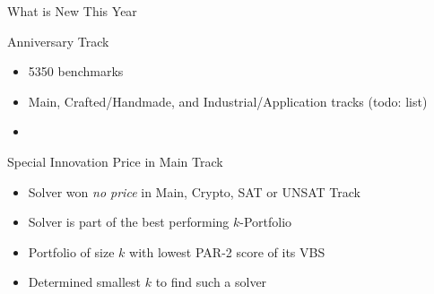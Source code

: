 \documentclass[trans]{beamer}
\begin{document}
\begin{frame}{What is New This Year}

\begin{block}{Anniversary Track}
\begin{itemize}
  \item 5350 benchmarks
  \item Main, Crafted/Handmade, and Industrial/Application tracks (todo: list)
  \item 
\end{itemize}
\end{block}

\begin{block}{Special Innovation Price in Main Track}
  \begin{itemize}
  \item Solver won \emph{no price} in Main, Crypto, SAT or UNSAT Track 
  \item Solver is part of the best performing $k$-Portfolio
  \item Portfolio of size $k$ with lowest PAR-2 score of its VBS
  \item Determined smallest $k$ to find such a solver
  \end{itemize}
\end{block}

\end{frame}
\end{document}
